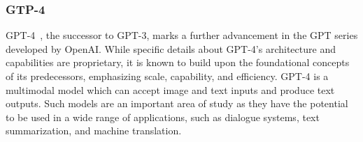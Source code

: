 \subsubsection{GTP-4}
\label{subsubsec:gpt-4}

GPT-4~\cite{openai2024gpt4}, the successor to GPT-3, marks a further advancement in the GPT series developed by OpenAI. While specific details about GPT-4's architecture and capabilities are proprietary, it is known to build upon the foundational concepts of its predecessors, emphasizing scale, capability, and efficiency.
GPT-4 is a multimodal model which can accept image and text inputs and produce text outputs.
Such models are an important area of study as they have the potential to be used in a wide range of applications, such as dialogue systems, text summarization, and machine translation.

